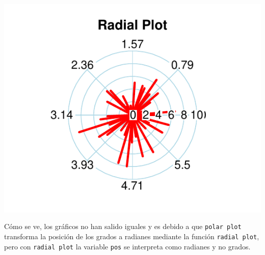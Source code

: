 \documentclass{article}\usepackage[]{graphicx}\usepackage[]{color}
\makeatletter
\def\maxwidth{ %
  \ifdim\Gin@nat@width>\linewidth
    \linewidth
  \else
    \Gin@nat@width
  \fi
}
\newenvironment{knitrout}{}{} %
\makeatother
\begin{document}
\begin{knitrout}
{\centering \includegraphics[width=\maxwidth]{figure/plot_plotrix_cr-2} 

}



\end{knitrout}
C\'omo se ve, los gr\'aficos no han salido iguales y es debido a que \texttt{polar plot} transforma la posici\'on de los grados a radianes mediante la funci\'on \texttt{radial plot}, pero con \texttt{radial plot} la variable \texttt{pos} se interpreta como radianes y no grados.
\clearpage
\end{document}
